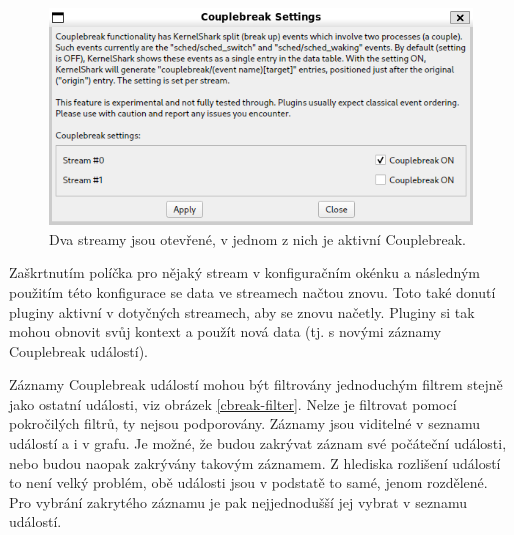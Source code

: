 \begin{figure}[p]\centering
    \includegraphics[width=140mm]{img/Modifikace/modif-couplebreak-multiconf}
    \caption{Dva streamy jsou otevřené, v jednom z nich je aktivní Couplebreak.}
    \label{cbreak-multiconf}
\end{figure}

Zaškrtnutím políčka pro nějaký stream v konfiguračním okénku a následným použitím této konfigurace se data ve streamech načtou znovu. Toto také donutí pluginy aktivní v dotyčných streamech, aby se znovu načetly. Pluginy si tak mohou obnovit svůj kontext a použít nová data (tj. s novými záznamy Couplebreak událostí).

Záznamy Couplebreak událostí mohou být filtrovány jednoduchým filtrem stejně jako ostatní události, viz obrázek \ref{cbreak-filter}. Nelze je filtrovat pomocí pokročilých filtrů, ty nejsou podporovány. Záznamy jsou viditelné v seznamu událostí a i v grafu. Je možné, že budou zakrývat záznam své počáteční události, nebo budou naopak zakrývány takovým záznamem. Z hlediska rozlišení událostí to není velký problém, obě události jsou v podstatě to samé, jenom rozdělené. Pro vybrání zakrytého záznamu je pak nejjednodušší jej vybrat v seznamu událostí.

